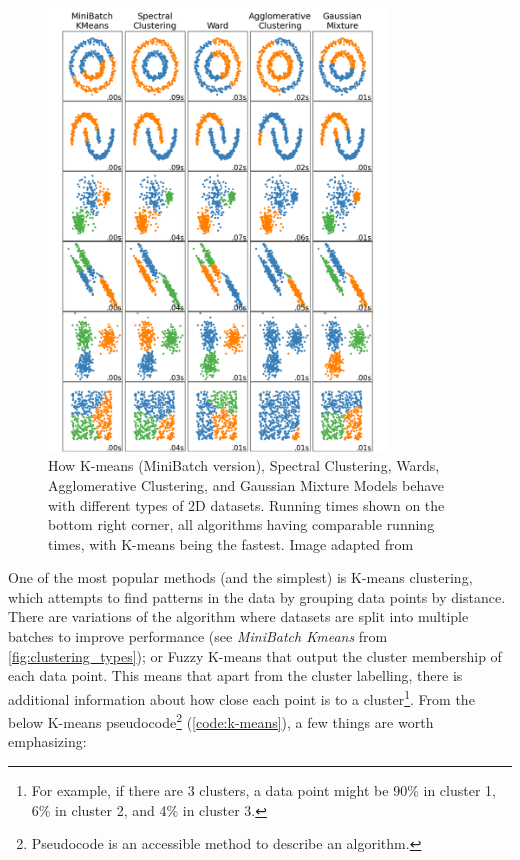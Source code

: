 \begin{figure}[!htb]
  \centering
  \includegraphics[width=0.8\textwidth,height=0.5\textheight,keepaspectratio]{Sections/Lit_review/Resources/clustering_scikit.png}
    \caption{How K-means (MiniBatch version), Spectral Clustering, Wards, Agglomerative Clustering, and Gaussian Mixture Models behave with different types of 2D datasets. Running times shown on the bottom right corner, all algorithms having comparable running times, with K-means being the fastest. Image adapted from \cite{Scikit-learn_undated-ax}}
    \label{fig:lit:clustering_types}
\end{figure}
\FloatBarrier

One of the most popular methods (and the simplest) is K-means clustering, which attempts to find patterns in the data by grouping data points by distance. There are variations of the algorithm where datasets are split into multiple batches to improve performance (see \textit{MiniBatch Kmeans} from \cref{fig:clustering_types}); or Fuzzy K-means that output the cluster membership of each data point. This means that apart from the cluster labelling, there is additional information about how close each point is to a cluster\footnote{For example, if there are 3 clusters, a data point might be 90\% in cluster 1, 6\% in cluster 2, and 4\% in cluster 3.}. From the below K-means pseudocode\footnote{Pseudocode is an accessible method to describe an algorithm.} (\cref{code:k-means}), a few things are worth emphasizing:

